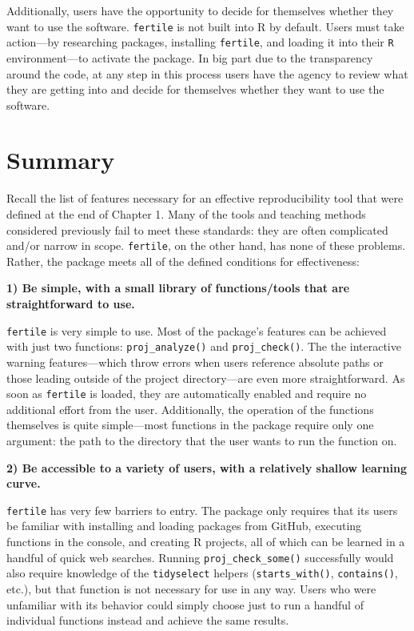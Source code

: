 \documentclass[12pt,twoside]{reedthesis}
\begin{document}
Additionally, users have the opportunity to decide for themselves whether they want to use the software. \texttt{fertile} is not built into R by default. Users must take action---by researching packages, installing \texttt{fertile}, and loading it into their \texttt{R} environment---to activate the package. In big part due to the transparency around the code, at any step in this process users have the agency to review what they are getting into and decide for themselves whether they want to use the software.

\hypertarget{summary}{%
\section{Summary}\label{summary}}

Recall the list of features necessary for an effective reproducibility tool that were defined at the end of Chapter 1. Many of the tools and teaching methods considered previously fail to meet these standards: they are often complicated and/or narrow in scope. \texttt{fertile}, on the other hand, has none of these problems. Rather, the package meets all of the defined conditions for effectiveness:

\textbf{1) Be simple, with a small library of functions/tools that are straightforward to use.}

\texttt{fertile} is very simple to use. Most of the package's features can be achieved with just two functions: \texttt{proj\_analyze()} and \texttt{proj\_check()}. The the interactive warning features---which throw errors when users reference absolute paths or those leading outside of the project directory---are even more straightforward. As soon as \texttt{fertile} is loaded, they are automatically enabled and require no additional effort from the user. Additionally, the operation of the functions themselves is quite simple---most functions in the package require only one argument: the path to the directory that the user wants to run the function on.

\textbf{2) Be accessible to a variety of users, with a relatively shallow learning curve.}

\texttt{fertile} has very few barriers to entry. The package only requires that its users be familiar with installing and loading packages from GitHub, executing functions in the console, and creating R projects, all of which can be learned in a handful of quick web searches. Running \texttt{proj\_check\_some()} successfully would also require knowledge of the \texttt{tidyselect} helpers (\texttt{starts\_with()}, \texttt{contains()}, etc.), but that function is not necessary for use in any way. Users who were unfamiliar with its behavior could simply choose just to run a handful of individual functions instead and achieve the same results.
\end{document}

